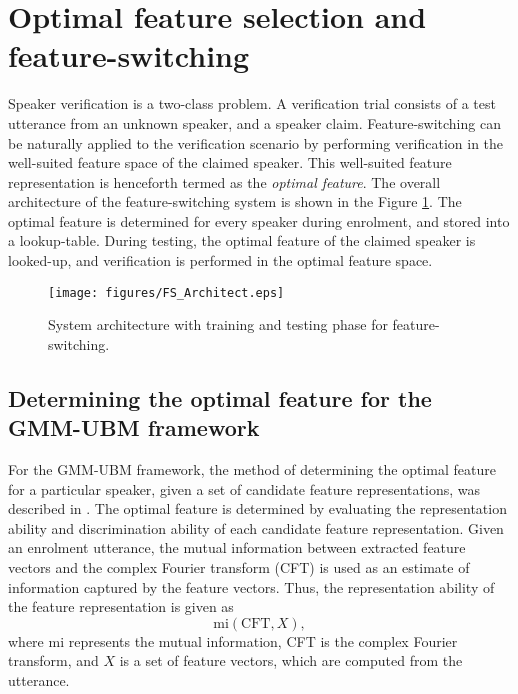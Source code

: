\documentclass{article}
\begin{document}
\section{Optimal feature selection and feature-switching}
\label{sec:optFeat}

Speaker verification is a two-class problem. A verification trial consists of a
test utterance from an unknown speaker, and a speaker claim. Feature-switching
can be naturally applied to the verification scenario by performing
verification in the well-suited feature space of the claimed speaker. This
well-suited feature representation is henceforth termed as the \emph{optimal
feature}. The overall architecture of the feature-switching system is shown in the
Figure \ref{fig:systemArch}. The optimal feature is determined for every speaker
during enrolment, and stored into a lookup-table. During testing, the optimal
feature of the claimed speaker is looked-up, and verification is performed in
the optimal feature space.

\begin{figure}[th]
\centering
\texttt{[image: figures/FS\_Architect.eps]}
\caption{System architecture with training and testing phase for feature-switching.}
\label{fig:systemArch}
\end{figure}



\subsection{Determining the optimal feature for the GMM-UBM framework}
\label{subsec:ubm_optFeat}

For the GMM-UBM framework, the method of determining the optimal feature for a
particular speaker, given a set of candidate feature representations, was
described in \cite{padmanInterspeech2010}. The optimal feature is determined by
evaluating the representation ability and discrimination ability
of each candidate feature representation. Given an enrolment utterance, the
mutual information between extracted feature vectors and the complex Fourier
transform (CFT) is used as an estimate of information captured by the feature
vectors. Thus, the representation ability of the feature representation is given
as 
\begin{equation}
\textrm{mi}(\textrm{CFT},X),
\end{equation}
where $\textrm{mi}$ represents the mutual information, CFT is the complex
Fourier transform, and $X$ is a set of feature vectors, which are computed from
the utterance.
\end{document}
